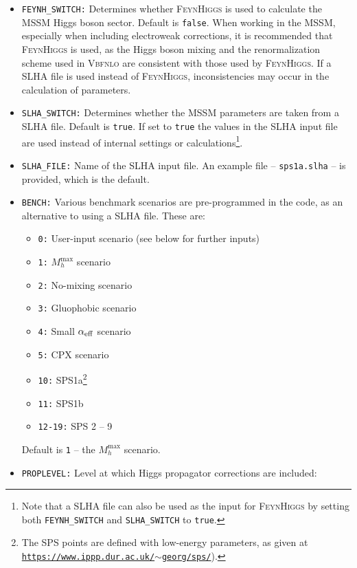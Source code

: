 \documentclass[english,12pt]{article}
\begin{document}
\begin{itemize}
 \item {\tt FEYNH\_SWITCH:} Determines whether \textsc{FeynHiggs} is used to
calculate the MSSM Higgs boson sector.  Default is {\tt false}.  When working in the
MSSM, especially when including electroweak corrections, it is recommended that
\textsc{FeynHiggs} is used, as the Higgs boson mixing and the renormalization scheme used
in \textsc{Vbfnlo} are consistent with those used by \textsc{FeynHiggs}.  If a
SLHA file is used instead of \textsc{FeynHiggs}, inconsistencies may occur in
the calculation of parameters.
 \item {\tt SLHA\_SWITCH:} Determines whether the MSSM parameters are taken from
a SLHA file.  Default is {\tt true}.  If set to {\tt true} the values in the
SLHA input file are used instead of internal settings or calculations\footnote{Note that a SLHA file can also be used as the input for \textsc{FeynHiggs} by setting both {\tt FEYNH\_SWITCH} and {\tt SLHA\_SWITCH} to {\tt true}.}.
 \item {\tt SLHA\_FILE:} Name of the SLHA input file.  An example file --
{\tt sps1a.slha} -- is provided, which is the default.
 \item {\tt BENCH:}  Various benchmark scenarios are pre-programmed in the code,
as an alternative to using a SLHA file.  These are:
   \begin{itemize}
    \item {\tt 0:} User-input scenario  (see below for further inputs)
    \item {\tt 1:} $M_{h}^{\max}$ scenario ~\cite{Carena:2002qg}
    \item {\tt 2:} No-mixing scenario ~\cite{Carena:2002qg}
    \item {\tt 3:} Gluophobic scenario ~\cite{Carena:2002qg}
    \item {\tt 4:} Small $\alpha_{\rm eff}$ scenario ~\cite{Carena:2002qg}
    \item {\tt 5:} CPX scenario ~\cite{Schael:2006cr}
    \item {\tt 10:} SPS1a\footnote{The SPS points are defined with low-energy
parameters, as given at {\tt \href{https://www.ippp.dur.ac.uk/~georg/sps/}{https://www.ippp.dur.ac.uk/$\sim$georg/sps/}}).}
~\cite{Allanach:2002nj}
    \item {\tt 11:} SPS1b
    \item {\tt 12-19:} SPS 2 -- 9
   \end{itemize}
  Default is {\tt 1} -- the $M_{h}^{\max}$ scenario. 
 \item {\tt PROPLEVEL:}  Level at which Higgs propagator corrections are included:

\end{itemize}
\end{document}
